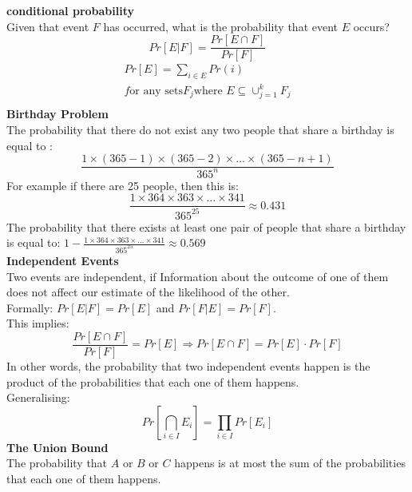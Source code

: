 \documentclass[onecolumn]{report}
\begin{document}
\textbf{conditional probability}\\
Given that event $F$ has occurred, what is the probability that event $E$ occurs?\\
\begin{equation*}
    Pr[E|F]=\frac{Pr[E \cap F]}{Pr[F]}
\end{equation*}
\begin{align*}
    Pr[E]=\sum_{i \in E} Pr(i)\\
    f \text{or any sets} F_j \text{where }E \subseteq \cup_{j=1}^k F_j\\
\end{align*}
\textbf{Birthday Problem}\\
The probability that there do not exist any two people that share a birthday is equal to :
\begin{equation*}
    \frac{1 \times (365-1) \times (365-2) \times \dots \times (365-n+1)}{365^n}
\end{equation*}
For example if there are 25 people, then this is:
\begin{equation*}
    \frac{1 \times 364 \times 363 \times \dots \times 341}{365^{25}} \approx 0.431
\end{equation*}
The probability that there exists at least one pair of people that share a birthday is equal to: $1-\frac{1 \times 364 \times 363 \times \dots \times 341}{365^{25}} \approx 0.569$\\
\textbf{Independent Events}\\
Two events are independent, if Information about the outcome of one of them does not affect our estimate of the likelihood of the other.\\
Formally: $Pr[E|F]=Pr[E]$ and $Pr[F|E]=Pr[F]$.\\
This implies:
\begin{equation*}
    \frac{Pr[E \cap F]}{Pr[F]}=Pr[E] \Rightarrow Pr[E \cap F]=Pr[E] \cdot Pr[F]
\end{equation*}
In other words, the probability that two independent events happen is the product of the probabilities that each one of them happens.\\
Generalising:
\begin{equation*}
    Pr[\bigcap_{i\in I} E_i]=\prod_{i \in I} Pr[E_i]
\end{equation*}
\noindent
\textbf{The Union Bound}\\
The probability that $A \text{ or } B \text{ or } C$ happens is at most the sum of the probabilities that each one of them happens.\\
\end{document}
